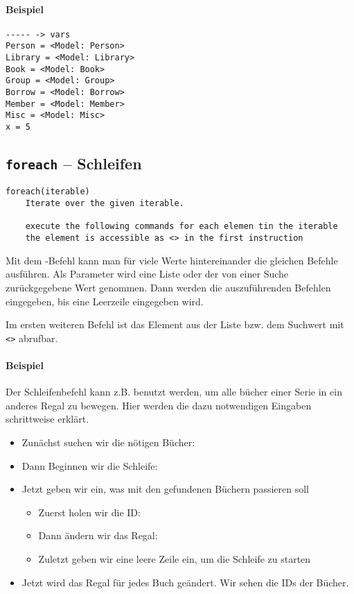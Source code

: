 \paragraph{Beispiel}
\begin{verbatim}
----- -> vars
Person = <Model: Person>
Library = <Model: Library>
Book = <Model: Book>
Group = <Model: Group>
Borrow = <Model: Borrow>
Member = <Model: Member>
Misc = <Model: Misc>
x = 5
\end{verbatim}

\subsection{\texttt{foreach} -- Schleifen}
\label{subsec:command_list:foreach}

\begin{verbatim}
foreach(iterable)
    Iterate over the given iterable.

    execute the following commands for each elemen tin the iterable
    the element is accessible as <> in the first instruction
\end{verbatim}

Mit dem -Befehl kann man für viele Werte hintereinander die gleichen Befehle ausführen. Als Parameter wird eine Liste oder der von einer Suche zurückgegebene Wert genommen. Dann werden die auszuführenden Befehlen eingegeben, bis eine Leerzeile eingegeben wird.

Im ersten weiteren Befehl ist das Element aus der Liste bzw. dem Suchwert mit \texttt{<>} abrufbar.

\paragraph{Beispiel}

Der Schleifenbefehl kann z.B. benutzt werden, um alle bücher einer Serie in ein anderes Regal zu bewegen. Hier werden die dazu notwendigen Eingaben schrittweise erklärt.

\begin{itemize}
\item Zunächst suchen wir die nötigen Bücher:\\ 
\item Dann Beginnen wir die Schleife: 
\item Jetzt geben wir ein, was mit den gefundenen Büchern passieren soll
\begin{itemize}
\item Zuerst holen wir die ID: 
\item Dann ändern wir das Regal: 
\item Zuletzt geben wir eine leere Zeile ein, um die Schleife zu starten
\end{itemize}
\item Jetzt wird das Regal für jedes Buch geändert. Wir sehen die IDs der Bücher.
\end{itemize}



